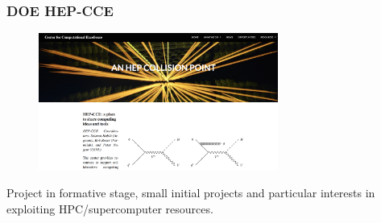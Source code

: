 \begin{frame}
\frametitle{DOE HEP-CCE}


\begin{figure}[htbp]
\begin{center}
\includegraphics[width=0.7\textwidth]{images/hepcce-webpage.png}
\end{center}
\end{figure}

\small{Project in formative stage, small initial projects and particular interests in exploiting HPC/supercomputer resources.}

\end{frame}


